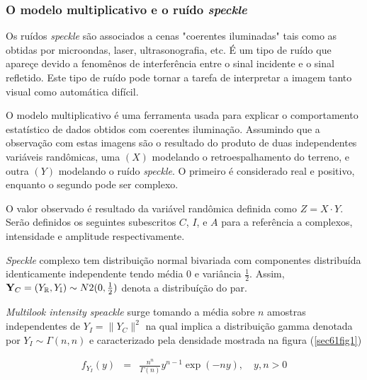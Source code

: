 \documentclass[12pt,a4paper]{article}
\begin{document}
\subsubsection{O modelo multiplicativo e o ruído {\it speckle}}

Os ruídos {\it speckle} são associados a cenas "coerentes iluminadas" tais como as obtidas por microondas, laser, ultrasonografia, etc. É um tipo de ruído que apareçe devido a fenomênos de interferência entre o sinal incidente e o sinal refletido. Este tipo de ruído pode tornar a tarefa de interpretar a imagem tanto visual como automática difícil. 

O modelo multiplicativo é uma ferramenta usada para explicar o comportamento estatístico de dados obtidos com coerentes iluminação. Assumindo que a observação com estas imagens são o resultado do produto de duas independentes variáveis randômicas, uma $(X)$ modelando o retroespalhamento do terreno, e outra $(Y)$ modelando o ruído {\it speckle}. O primeiro é considerado real e positivo, enquanto o segundo pode ser complexo.

O valor observado é resultado da variável randômica definida como $Z=X\cdot Y$. Serão definidos os seguintes subescritos $C$, $I$, e $A$ para a referência a complexos, intensidade e amplitude respectivamente.

{\it Speckle} complexo tem distribuição normal bivariada com componentes distribuída identicamente independente tendo média $0$ e variância $\frac{1}{2}$. Assim, ${\bf Y}_{C}=(Y_{\mathbb{R}}, Y_{\mathbb{I}})\sim N2(0,\frac{1}{2})$ denota a distribuíção do par.

{\it Multilook intensity speackle} surge tomando a média sobre $n$ amostras independentes de $Y_{I}=\|Y_{C}\|^2$ na qual implica a distribuição gamma denotada por $Y_{I}\sim \Gamma(n,n)$ e caracterizado pela densidade mostrada na figura (\ref{sec61fig1})

\begin{equation}\label{sec61eqn1}
\begin{array}{ccc}
	f_{Y_{I}}(y)&=&\frac{n^{n}}{\Gamma(n)}y^{n-1}\exp\left(-ny\right),\quad y,n>0 \\
\end{array}
\end{equation}
\end{document}
